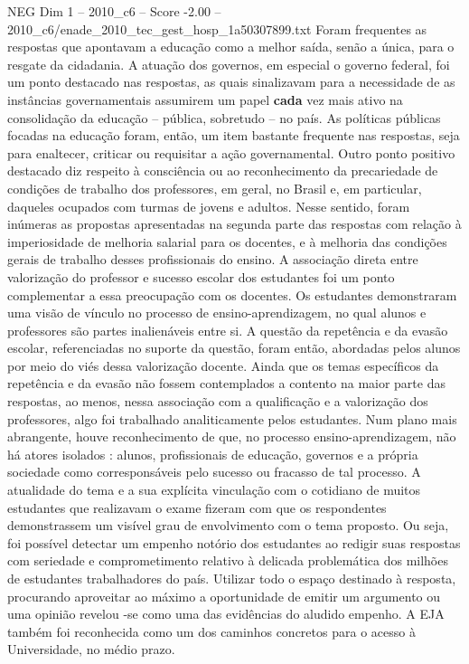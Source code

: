 \begin{textsample}{NEG Dim 1 – 2010\_c6 – Score -2.00 – 2010\_c6/enade\_2010\_tec\_gest\_hosp\_1a50307899.txt}
Foram frequentes as respostas que apontavam a educação como a melhor saída, senão a única, para o resgate da cidadania.
A atuação dos governos, em especial o governo federal, foi um ponto destacado nas respostas, as quais sinalizavam para a necessidade de as instâncias governamentais assumirem um papel \textbf{cada} vez mais ativo na consolidação da educação – pública, sobretudo – no país.
As políticas públicas focadas na educação foram, então, um item bastante frequente nas respostas, seja para enaltecer, criticar ou requisitar a ação governamental.
Outro ponto positivo destacado diz respeito à consciência ou ao reconhecimento da precariedade de condições de trabalho dos professores, em geral, no Brasil e, em particular, daqueles ocupados com turmas de jovens e adultos.
Nesse sentido, foram inúmeras as propostas apresentadas na segunda parte das respostas com relação à imperiosidade de melhoria salarial para os docentes, e à melhoria das condições gerais de trabalho desses profissionais do ensino.
A associação direta entre valorização do professor e sucesso escolar dos estudantes foi um ponto complementar a essa preocupação com os docentes.
Os estudantes demonstraram uma visão de vínculo no processo de ensino-aprendizagem, no qual alunos e professores são partes inalienáveis entre si.
A questão da repetência e da evasão escolar, referenciadas no suporte da questão, foram então, abordadas pelos alunos por meio do viés dessa valorização docente.
Ainda que os temas específicos da repetência e da evasão não fossem contemplados a contento na maior parte das respostas, ao menos, nessa associação com a qualificação e a valorização dos professores, algo foi trabalhado analiticamente pelos estudantes.
Num plano mais abrangente, houve reconhecimento de que, no processo ensino-aprendizagem, não há atores isolados : alunos, profissionais de educação, governos e a própria sociedade como corresponsáveis pelo sucesso ou fracasso de tal processo.
A atualidade do tema e a sua explícita vinculação com o cotidiano de muitos estudantes que realizavam o exame fizeram com que os respondentes demonstrassem um visível grau de envolvimento com o tema proposto.
Ou seja, foi possível detectar um empenho notório dos estudantes ao redigir suas respostas com seriedade e comprometimento relativo à delicada problemática dos milhões de estudantes trabalhadores do país.
Utilizar todo o espaço destinado à resposta, procurando aproveitar ao máximo a oportunidade de emitir um argumento ou uma opinião revelou -se como uma das evidências do aludido empenho.
A EJA também foi reconhecida como um dos caminhos concretos para o acesso à Universidade, no médio prazo.

\end{textsample}
